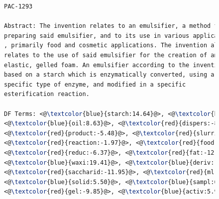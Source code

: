 \begin{figure}[t!]
\begin{framed}
\vspace*{-2ex}
  \centering
 \begin{lstlisting}[basicstyle=\small\ttfamily , linewidth=\columnwidth,breaklines=true, language=TeX] 
PAC-1293

Abstract: The invention relates to an emulsifier, a method for 
preparing said emulsifier, and to its use in various applications
, primarily food and cosmetic applications. The invention also 
relates to the use of said emulsifier for the creation of an 
elastic, gelled foam. An emulsifier according to the invention is 
based on a starch which is enzymatically converted, using a 
specific type of enzyme, and modified in a specific 
esterification reaction.

DF Terms: <@\textcolor{blue}{starch:14.64}@>, <@\textcolor{blue}{enzym:29.49}@>, <@\textcolor{red}{amylos:-20.15}@>, 
<@\textcolor{blue}{oil:8.63}@>, <@\textcolor{red}{dispers:-8.66}@>, <@\textcolor{red}{ph:-4.55}@>, <@\textcolor{red}{dry:-6.21}@>, <@\textcolor{red}{heat:-2.26}@>, 
<@\textcolor{red}{product:-5.48}@>, <@\textcolor{red}{slurri:-11.48}@>, <@\textcolor{blue}{viscos:7.77}@>, <@\textcolor{red}{composit:-4.49}@>, 
<@\textcolor{red}{reaction:-1.97}@>, <@\textcolor{red}{food:-11.94}@>, <@\textcolor{blue}{agent:5.19}@>, <@\textcolor{red}{debranch:-10.58}@>, 
<@\textcolor{red}{reduc:-6.37}@>, <@\textcolor{red}{fat:-12.83}@>, <@\textcolor{red}{prepar:-0.82}@>, <@\textcolor{red}{hour:-5.42}@>, 
<@\textcolor{blue}{waxi:19.41}@>, <@\textcolor{blue}{deriv:11.97}@>, <@\textcolor{red}{content:-3.38}@>, <@\textcolor{blue}{aqueou:0.38}@>, 
<@\textcolor{red}{saccharid:-11.95}@>, <@\textcolor{red}{ml:-0.79}@>, <@\textcolor{red}{cook:-10.04}@>, <@\textcolor{blue}{modifi:5.65}@>, 
<@\textcolor{blue}{solid:5.50}@>, <@\textcolor{blue}{sampl:6.27}@>, <@\textcolor{blue}{mix:2.48}@>, <@\textcolor{red}{minut:-1.68}@>, <@\textcolor{red}{dri:-0.91}@>, 
<@\textcolor{red}{gel:-9.85}@>, <@\textcolor{blue}{activ:5.98}@>, <@\textcolor{red}{corn:-5.27}@>, <@\textcolor{blue}{alpha:12}@>, <@\textcolor{red}{sprai:-2.74}@> 


\end{lstlisting}
\end{framed}
\end{figure}
